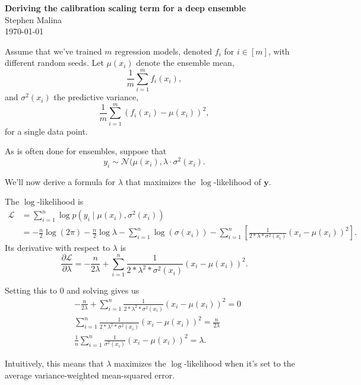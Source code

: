 \documentclass[12pt]{article}
\begin{document}
\begin{flushleft}
\textbf{Deriving the calibration scaling term for a deep ensemble} \\
Stephen Malina \\
\today
\end{flushleft}

\vspace{0.1in}

\normalsize

Assume that we've trained \( m \) regression models, denoted \( f_i \) for \( i \in [m] \), with different random seeds. Let \( \mu(x_i) \) denote
the ensemble mean,
\[ \frac{1}{m} \sum_{i=1}^m f_i(x_i), \]
and \( \sigma^2(x_i) \) the predictive variance,
\[ \frac{1}{m} \sum_{i=1}^m (f_i(x_i) - \mu(x_i))^2, \]
for a single data point.

As is often done for ensembles, suppose that
\[ y_i \sim \mathcal{N}(\mu(x_i), \lambda \cdot \sigma^2(x_i). \]

We'll now derive a formula for \( \lambda \) that maximizes the \( \log \)-likelihood of \( \mathbf{y} \). 

The \( \log \)-likelihood is
\begin{align}
	\mathcal{L} &= \sum_{i=1}^n \log p(y_i \mid \mu(x_i), \sigma^2(x_i)) \\
		    &= -\frac{n}{2} \log(2\pi) - \frac{n}{2} \log \lambda - \sum_{i=1}^n \log(\sigma(x_i)) - \sum_{i=1}^n \left[ \frac{1}{2 * \lambda * \sigma^2(x_i)} \left( x_i - \mu(x_i) \right)^2 \right].
\end{align}
Its derivative with respect to \( \lambda \) is
\begin{equation}
	\frac{\partial \mathcal{L}}{\partial \lambda} = -\frac{n}{2\lambda} + \sum_{i=1}^n \frac{1}{2 * \lambda^2 * \sigma^2(x_i)} (x_i - \mu(x_i))^2.
\end{equation}

Setting this to \( 0 \) and solving gives us
\begin{align}
	& -\frac{n}{2\lambda} + \sum_{i=1}^n \frac{1}{2 * \lambda^2 * \sigma^2(x_i)} (x_i - \mu(x_i))^2 = 0 \\
	& \sum_{i=1}^n \frac{1}{2 * \lambda^2 * \sigma^2(x_i)} (x_i - \mu(x_i))^2 = \frac{n}{2 \lambda} \\
	& \frac{1}{n} \sum_{i=1}^n \frac{1}{\sigma^2(x_i)} (x_i - \mu(x_i))^2 = \lambda.
\end{align}

Intuitively, this means that \( \lambda \) maximizes the \( \log \)-likelihood when it's set to the average variance-weighted mean-squared error.
\end{document}
